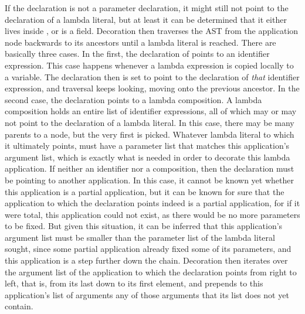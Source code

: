 If the  declaration is not a parameter declaration, it might still not point to the declaration of a lambda literal, but at least it can be determined that it either lives inside , or is a field. Decoration then traverses the AST from the application node backwards to its ancestors until a lambda literal is reached. There are basically three cases. In the first, the declaration of  points to an identifier expression. This case happens whenever a lambda expression is copied locally to a variable. The declaration then is set to point to the declaration of \emph{that} identifier expression, and traversal keeps looking, moving onto the previous ancestor. In the second case, the declaration points to a lambda composition. A lambda composition holds an entire list of identifier expressions, all of which may or may not point to the declaration of a lambda literal. In this case, there may be many parents to a node, but the very first is picked. Whatever lambda literal to which it ultimately points, must have a parameter list that matches this application's argument list, which is exactly what is needed in order to decorate this lambda application. If neither an identifier nor a composition, then the declaration must be pointing to another application. In this case, it cannot be known yet whether this application is a partial application, but it can be known for sure that the application to which the declaration points indeed is a partial application, for if it were total, this application could not exist, as there would be no more parameters to be fixed. But given this situation, it can be inferred that this application's argument list must be smaller than the parameter list of the lambda literal sought, since some partial application already fixed some of its parameters, and this application is a step further down the chain. Decoration then iterates over the argument list of the application to which the declaration points from right to left, that is, from its last down to its first element, and prepends to this application's list of arguments any of those arguments that its list does not yet contain.


